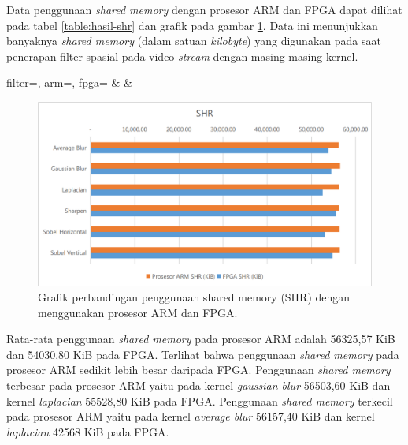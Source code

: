 Data penggunaan \textit{shared memory} dengan prosesor ARM dan FPGA dapat dilihat pada tabel \ref{table:hasil-shr} dan grafik pada gambar \ref{fig:chart-shr}. Data ini menunjukkan banyaknya \textit{shared memory} (dalam satuan \textit{kilobyte}) yang digunakan pada saat penerapan filter spasial pada video \textit{stream} dengan masing-masing kernel.
\begin{atable}
    \caption{Tabel perbandingan penggunaan shared memory (SHR) dengan menggunakan prosesor ARM dan FPGA.}
    \label{table:hasil-shr}
        {
            filter=\filter, 
            arm=\arm, 
            fpga=\fpga}
        {
            \filter & 
            \arm & 
            \fpga }
\end{atable}

\begin{figure}[ht]
    \includegraphics[width=0.81\linewidth, center]{images/chart/chart-shr.png}
    \caption{Grafik perbandingan penggunaan shared memory (SHR) dengan menggunakan prosesor ARM dan FPGA.}
    \label{fig:chart-shr}
\end{figure}
Rata-rata penggunaan \textit{shared memory} pada prosesor ARM adalah 56325,57 KiB dan 54030,80 KiB pada FPGA. Terlihat bahwa penggunaan \textit{shared memory} pada prosesor ARM sedikit lebih besar daripada FPGA. Penggunaan \textit{shared memory} terbesar pada prosesor ARM yaitu pada kernel \textit{gaussian blur} 56503,60 KiB dan kernel \textit{laplacian} 55528,80 KiB pada FPGA. Penggunaan \textit{shared memory} terkecil pada prosesor ARM yaitu pada kernel \textit{average blur} 56157,40 KiB dan kernel \textit{laplacian} 42568 KiB pada FPGA.

